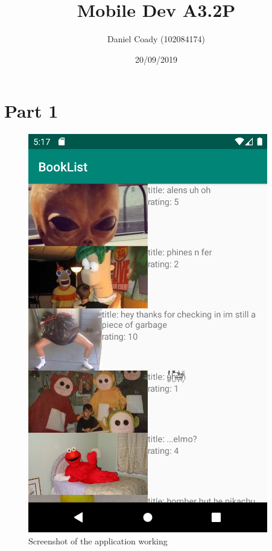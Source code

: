 \documentclass{scrartcl}
\title{Mobile Dev A3.2P}
\author{Daniel Coady (102084174)}
\date{20/09/2019}
\begin{document}
\maketitle

\section*{Part 1}

\begin{figure}[h]
    \centering
    \includegraphics[scale=0.7]{images/screen1.png}
    \caption{Screenshot of the application working}
\end{figure}
\end{document}
